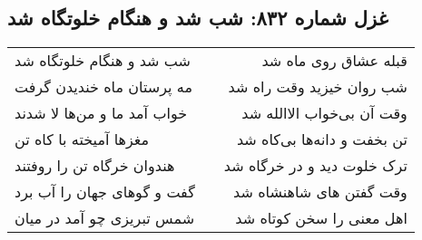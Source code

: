 \begin{center}
\section*{غزل شماره ۸۳۲: شب شد و هنگام خلوتگاه شد}
\label{sec:0832}
\begin{longtable}{l p{0.5cm} r}
شب شد و هنگام خلوتگاه شد
&&
قبله عشاق روی ماه شد
\\
مه پرستان ماه خندیدن گرفت
&&
شب روان خیزید وقت راه شد
\\
خواب آمد ما و من‌ها لا شدند
&&
وقت آن بی‌خواب الاالله شد
\\
مغزها آمیخته با کاه تن
&&
تن بخفت و دانه‌ها بی‌کاه شد
\\
هندوان خرگاه تن را روفتند
&&
ترک خلوت دید و در خرگاه شد
\\
گفت و گوهای جهان را آب برد
&&
وقت گفتن های شاهنشاه شد
\\
شمس تبریزی چو آمد در میان
&&
اهل معنی را سخن کوتاه شد
\\
\end{longtable}
\end{center}
